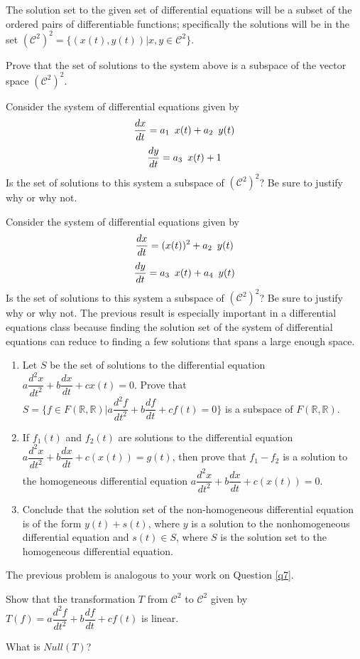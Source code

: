 The solution set to the given set of differential equations will be a subset of the ordered pairs of differentiable functions; specifically the solutions will be in the set $(\mathcal{C}^2)^2=\{ (x(t),y(t))|x,y \in \mathcal{C}^2\}$.

\item Prove that the set of solutions to the system above is a subspace of the vector space $(\mathcal{C}^2)^2$.
\item Consider the system of differential equations given by $$\dfrac{dx}{dt} = a_1 \enskip x(t)+a_2 \enskip y(t)$$ $$\dfrac{dy}{dt} = a_3 \enskip x(t) + 1  $$
Is the set of solutions to this system a subspace of $(\mathcal{C}^2)^2$? Be sure to justify why or why not.
\item Consider the system of differential equations given by $$\dfrac{dx}{dt} =  (x(t))^2 +a_2 \enskip y(t)$$ $$\dfrac{dy}{dt} = a_3 \enskip x(t) + a_4 \enskip y(t)  $$
Is the set of solutions to this system a subspace of $(\mathcal{C}^2)^2$? Be sure to justify why or why not.
\ee
\eq
The previous result is especially important in a differential equations class because finding the solution set of the system of differential equations can reduce to finding a few solutions that spans a large enough space.

\bq \begin{enumerate}
\item Let $S$ be the set of solutions to the differential equation $a\dfrac{d^2x}{dt^2}+b\dfrac{dx}{dt}+c x(t)= 0$. Prove that $S=\{f \in F(\mathbb{R},\mathbb{R}) | a\dfrac{d^2f}{dt^2}+b\dfrac{df}{dt}+c f(t)= 0 \}$  is a subspace of $F(\mathbb{R},\mathbb{R})$.
\item If $f_1(t)$ and $f_2(t)$ are solutions to the differential equation $a\dfrac{d^2x}{dt^2}+b\dfrac{dx}{dt}+c (x(t))= g(t)$, then prove that $f_1-f_2$ is a solution to the homogeneous differential equation $a\dfrac{d^2x}{dt^2}+b\dfrac{dx}{dt}+c (x(t))= 0$.
\item Conclude that the solution set of the non-homogeneous differential equation is of the form $y(t)+s(t)$, where $y$ is a solution to the nonhomogeneous differential equation and $s(t) \in S$, where $S$ is the solution set to the homogeneous differential equation.
\end{enumerate}
\eq
The previous problem is analogous to your work on Question \ref{q7}.
\bq \be
\item Show that the transformation $T$ from $\mathcal{C}^2$ to $\mathcal{C}^2$ given by $T(f)=a\dfrac{d^2f}{dt^2}+b\dfrac{df}{dt}+c f(t)$ is linear.
\item What is $Null(T)$?
\ee
\eq


